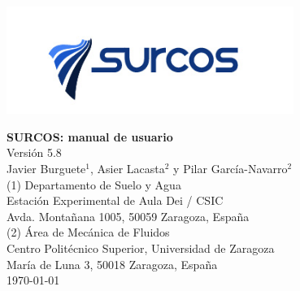 \documentclass[11pt, twoside, openany, a4paper]{book}
\begin{document}

\nocite{*}

\renewcommand{\tablename}{Tabla}
\renewcommand{\listtablename}{Índice de tablas}
\renewcommand{\bibname}{Bibliografía}

\pagestyle{empty}

\begin{titlepage} 
\begin{center} 
 
\includegraphics*[height=3.5cm]{images/logo_surcos.png} 

\vspace*{3.5cm} 
{\Huge \textbf{SURCOS: manual de usuario\\}}
\vspace*{1cm} 
{\normalsize Versión 5.8}\\
\vspace*{1cm} 
{\Large Javier Burguete$^1$, Asier Lacasta$^2$ y Pilar García-Navarro$^2$}\\ 
\vspace*{2.5cm} 
{\normalsize (1) Departamento de Suelo y Agua}\\
{Estación Experimental de Aula Dei / CSIC}\\ 
{Avda. Montañana 1005, 50059 Zaragoza, España}\\ 
\vspace*{1cm} 
{\normalsize (2) Área de Mecánica de Fluidos}\\ 
{Centro Politécnico Superior, Universidad de Zaragoza}\\
{María de Luna 3, 50018 Zaragoza, España}\\
\vspace*{1cm} 
{\normalsize \today}\\ 
\end{center} 
\end{titlepage} 
\cleardoublepage

\pagestyle{plain}

\tableofcontents
\listoffigures

\cleardoublepage

\pagestyle{headings}


\cleardoublepage


\cleardoublepage


\cleardoublepage

%
\end{document}
